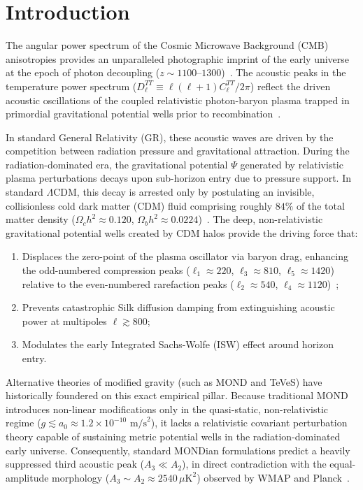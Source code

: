 \documentclass[aps,prd,reprint,superscriptaddress,nofootinbib,twocolumn]{revtex4-2}
\begin{document}
\maketitle

\section{Introduction}
\label{sec:intro}

The angular power spectrum of the Cosmic Microwave Background (CMB) anisotropies provides an unparalleled photographic imprint of the early universe at the epoch of photon decoupling ($z \sim 1100$--$1300$)~\cite{Planck2018_Cosmo,Planck2018_Likelihoods,Louis2025_ACTDR6}. The acoustic peaks in the temperature power spectrum ($D_\ell^{TT} \equiv \ell(\ell+1)C_\ell^{TT}/2\pi$) reflect the driven acoustic oscillations of the coupled relativistic photon-baryon plasma trapped in primordial gravitational potential wells prior to recombination~\cite{Peebles1968,HuSugiyama1995,Hu1997Nature}.

In standard General Relativity (GR), these acoustic waves are driven by the competition between radiation pressure and gravitational attraction. During the radiation-dominated era, the gravitational potential $\Psi$ generated by relativistic plasma perturbations decays upon sub-horizon entry due to pressure support. In standard $\Lambda\text{CDM}$, this decay is arrested only by postulating an invisible, collisionless cold dark matter (CDM) fluid comprising roughly $84\%$ of the total matter density ($\Omega_c h^2 \approx 0.120$, $\Omega_b h^2 \approx 0.0224$)~\cite{Planck2018_Cosmo}. The deep, non-relativistic gravitational potential wells created by CDM halos provide the driving force that:
\begin{enumerate}
    \item Displaces the zero-point of the plasma oscillator via baryon drag, enhancing the odd-numbered compression peaks ($\ell_1 \approx 220$, $\ell_3 \approx 810$, $\ell_5 \approx 1420$) relative to the even-numbered rarefaction peaks ($\ell_2 \approx 540$, $\ell_4 \approx 1120$)~\cite{HuSugiyama1996};
    \item Prevents catastrophic Silk diffusion damping from extinguishing acoustic power at multipoles $\ell \gtrsim 800$;
    \item Modulates the early Integrated Sachs-Wolfe (ISW) effect around horizon entry.
\end{enumerate}

Alternative theories of modified gravity (such as MOND and TeVeS) have historically foundered on this exact empirical pillar. Because traditional MOND introduces non-linear modifications only in the quasi-static, non-relativistic regime ($g \lesssim a_0 \approx 1.2 \times 10^{-10}\text{ m/s}^2$), it lacks a relativistic covariant perturbation theory capable of sustaining metric potential wells in the radiation-dominated early universe. Consequently, standard MONDian formulations predict a heavily suppressed third acoustic peak ($A_3 \ll A_2$), in direct contradiction with the equal-amplitude morphology ($A_3 \sim A_2 \approx 2540\,\mu\text{K}^2$) observed by WMAP and Planck~\cite{Planck2018_Cosmo}.
\end{document}

